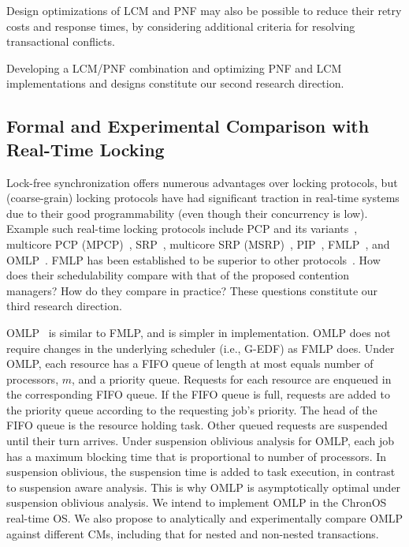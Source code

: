 \documentclass[12pt,english]{report}
\begin{document}
Design optimizations of LCM and PNF may also be possible to reduce their retry costs and response times, by considering additional criteria for resolving transactional conflicts. 

Developing a LCM/PNF combination and optimizing PNF and LCM implementations and designs constitute  our second research direction. 

\subsection{Formal and Experimental Comparison with Real-Time Locking} 

Lock-free synchronization offers numerous advantages over locking protocols, but (coarse-grain) locking protocols have had significant traction in real-time systems due to their good programmability (even though their concurrency is low).  Example such real-time locking protocols include PCP and its variants~\cite{chen1990dynamic,6031129,Rajkumar:1991:SRS:532621,sha1990priority}, multicore PCP (MPCP)~\cite{lakshmanan2009coordinated,rajkumar2002real}, SRP~\cite{Buttazzo:2004:HRC:1027504, baker1991stack}, multicore SRP (MSRP)~\cite{gai2003comparison}, PIP~\cite{easwaran2009resource}, FMLP~\cite{key-4,brandenburg2008implementation,holman2006locking}, and OMLP~\cite{Baruah:2007:TMG:1338441.1338647}. FMLP has been established to be superior to other protocols~\cite{brandenburg2008comparison}. How does their schedulability compare with that of the proposed contention managers? How do they compare in practice? These questions constitute our third research direction. 

OMLP~\cite{key-3} is similar to FMLP, and is simpler in implementation. OMLP does not require changes in the underlying scheduler (i.e., G-EDF) as FMLP does. Under OMLP, each resource has a FIFO queue of length at most equals number of processors, $m$, and a priority queue. Requests for each resource are enqueued in the corresponding FIFO queue. If the FIFO queue is full, requests are added to the priority queue according to the requesting job's priority. The head of the FIFO queue is the resource holding task. Other queued requests are suspended until their turn arrives. Under suspension oblivious analysis for OMLP, each job has a maximum blocking time that is proportional to number of processors. In suspension oblivious, the suspension time is added to task execution, in contrast to suspension aware analysis. This is why
OMLP is asymptotically optimal under suspension oblivious analysis. We intend to implement OMLP in the ChronOS real-time OS. We also propose to analytically and experimentally compare OMLP against different CMs, including that for nested and non-nested transactions.
\end{document}
